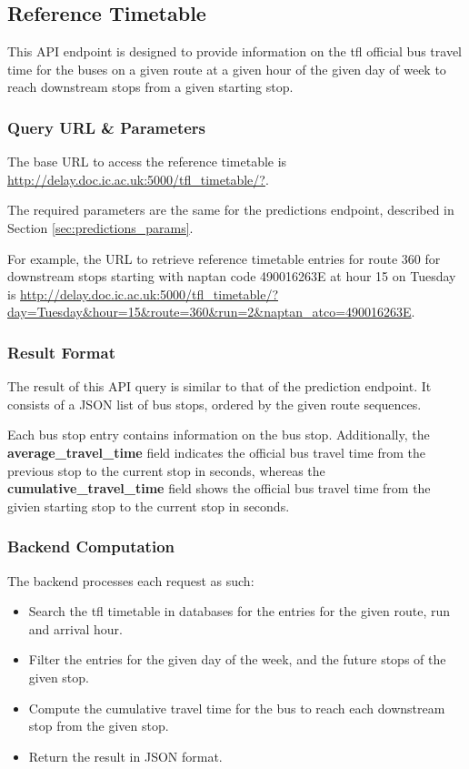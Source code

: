
\subsection{Reference Timetable}
\par This API endpoint is designed to provide information on the \acrshort{tfl} official bus travel time for the buses on a given route at a given hour of the given day of week to reach downstream stops from a given starting stop.

\subsubsection{Query URL \& Parameters}
\par The base URL to access the reference timetable is \url{http://delay.doc.ic.ac.uk:5000/tfl_timetable/?}.

\par The required parameters are the same for the predictions endpoint, described in Section \ref{sec:predictions_params}.

\par For example, the URL to retrieve reference timetable entries for route 360 for downstream stops starting with \gls{naptan} code 490016263E at hour 15 on Tuesday is \url{http://delay.doc.ic.ac.uk:5000/tfl_timetable/?day=Tuesday&hour=15&route=360&run=2&naptan_atco=490016263E}.

\subsubsection{Result Format}
\par The result of this API query is similar to that of the prediction endpoint. It consists of a JSON list of bus stops, ordered by the given route sequences.

\par Each bus stop entry contains information on the bus stop. Additionally, the \textbf{average\_travel\_time} field indicates the official bus travel time from the previous stop to the current stop in seconds, whereas the \textbf{cumulative\_travel\_time} field shows the official bus travel time from the givien starting stop to the current stop in seconds.

\subsubsection{Backend Computation}
The backend processes each request as such:

\begin{itemize}
  \item Search the tfl timetable in databases for the entries for the given route, run and arrival hour.
  \item Filter the entries for the given day of the week, and the future stops of the given stop.
  \item Compute the cumulative travel time for the bus to reach each downstream stop from the given stop.
  \item Return the result in JSON format.
\end{itemize}


